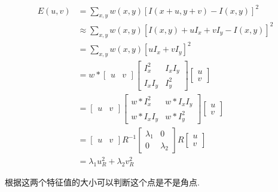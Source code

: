 \documentclass[lang=cn,10pt,green]{elegantbook}
\begin{document}
\begin{equation}
    \begin{aligned}
    E(u,v) &= \sum_{x,y} w(x,y) [I(x+u,y+v) - I(x,y)]^2\\
    &\approx \sum_{x,y} w(x,y) [I(x,y) + uI_x + vI_y - I(x,y)]^2\\
    &= \sum_{x,y} w(x,y) [uI_x + vI_y]^2\\
    &= w \ast \begin{bmatrix} u & v \end{bmatrix} \begin{bmatrix} I_x^2 & I_xI_y \\ I_xI_y & I_y^2 \end{bmatrix} \begin{bmatrix} u \\ v \end{bmatrix}\\
    &= \begin{bmatrix} u & v \end{bmatrix} \begin{bmatrix} w \ast I_x^2 & w \ast I_xI_y \\ w \ast I_xI_y & w \ast I_y^2 \end{bmatrix} \begin{bmatrix} u \\ v \end{bmatrix}\\
    &= \begin{bmatrix} u & v \end{bmatrix} R^{-1} \begin{bmatrix} \lambda_1 & 0\\ 0 & \lambda_2 \end{bmatrix} R \begin{bmatrix} u \\ v \end{bmatrix}\\
    &= \lambda_1 u_R^2 + \lambda_2 v_R^2
    \end{aligned}
\end{equation}

根据这两个特征值的大小可以判断这个点是不是角点.
\end{document}
